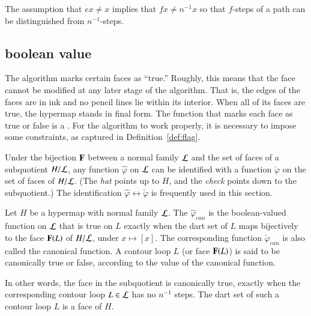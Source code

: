 \begin{remark}
The assumption that $e x \ne x$ implies that $f x \ne n^{-1} x$ so that $f$-steps of a 
path can be distinguished from $n^{-1}$-steps.
\end{remark}


\subsection{boolean value}
%

The algorithm marks certain faces as ``true.''  Roughly, this means that
the face cannot be modified at any later stage of the algorithm.
That is, the edges of the faces are in ink and no pencil lines lie
within its interior.  When all of its faces are true, the hypermap
stands in final form.  The function that marks each face as true or
false is a .  For the algorithm to work properly, it is
necessary to impose some constraints, as captured in
Definition~\ref{def:flag}.  %


Under the bijection ${\mathbf F}$ between a normal family ${\cal L}$ and the
set of faces of a subquotient $H/{\cal L}$, any function $\hat\varphi$
on ${\cal L}$ can be identified with a function $\check\varphi$ on the
set of faces of $H/{\cal L}$.  (The {\it hat} points up to $H$, and
the {\it check} points down to the subquotient.)  The identification
$\hat\varphi\leftrightarrow\check\varphi$ is frequently used  in
this section.

\begin{definition}
 Let $H$ be a hypermap with
  normal family $\cal L$.  The 
  $\hat\varphi_{can}$ is the boolean-valued function on ${\cal L}$
  that is true on $L$ exactly when the dart set of $L$ maps
  bijectively to the face ${\mathbf F}(L)$ of $H/{\cal L}$, under $x\mapsto [x]$.  The
  corresponding function $\check\varphi_{can}$ is also called the
  canonical function.  A contour loop $L$ (or face ${\mathbf F}(L)$)
  is said to be canonically true or false, according to the value of the canonical
  function.  
%
\end{definition}

In other words, the face in the subquotient is canonically true, exactly
when the corresponding contour loop $L\in {\cal L}$ has no $n^{-1}$
steps.  The dart set of such a contour loop $L$ is a face of $H$.  


